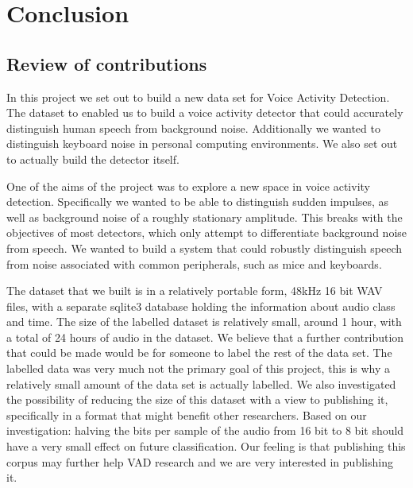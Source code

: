 \documentclass[ %
                    author={Sam Phippen},
                supervisor={Dr. Rafal Bogacz},
                     title={Real time voice activity detectors in noisy personal computing environments},
                  subtitle={},
                    degree={MEng},
                      year={2012} ]{thesis}
\begin{document}

\chapter{Conclusion}
\label{chap:conclusion}

\section{Review of contributions}

In this project we set out to build a new data set for Voice Activity
Detection.  The dataset to enabled us to build a voice activity detector that
could accurately distinguish human speech from background noise.  Additionally
we wanted to distinguish keyboard noise in personal computing environments. We
also set out to actually build the detector itself.


One of the aims of the project was to explore a new space in voice activity
detection.  Specifically we wanted to be able to distinguish sudden impulses,
as well as background noise of a roughly stationary amplitude. This breaks with
the objectives of most detectors, which only attempt to differentiate
background noise from speech. We wanted to build a system that could robustly
distinguish speech from noise associated with common peripherals, such as mice
and keyboards.

The dataset that we built is in a relatively portable form, 48kHz 16 bit WAV
files, with a separate sqlite3 database holding the information about audio
class and time. The size of the labelled dataset is relatively small, around 1
hour, with a total of 24 hours of audio in the dataset. We believe that a
further contribution that could be made would be for someone to label the rest
of the data set. The labelled data was very much not the primary goal of this
project, this is why a relatively small amount of the data set is actually
labelled. We also investigated the possibility of reducing the size of this
dataset with a view to publishing it, specifically in a format that might
benefit other researchers. Based on our investigation: halving the bits per
sample of the audio from 16 bit to 8 bit should have a very small effect on
future classification. Our feeling is that publishing this corpus may further
help VAD research and we are very interested in publishing it.
\end{document}
